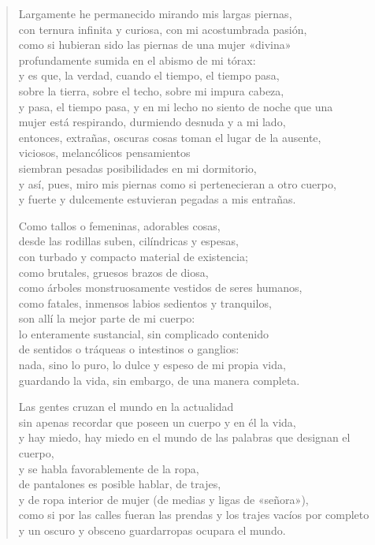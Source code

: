\documentclass[12pt]{article}
\begin{document}
\clearpage
{}
\begin{verse}

Largamente he permanecido mirando mis largas piernas,\\
con ternura infinita y curiosa, con mi acostumbrada pasión,\\
como si hubieran sido las piernas de una mujer «divina»\\
profundamente sumida en el abismo de mi tórax:\\
y es que, la verdad, cuando el tiempo, el tiempo pasa,\\
sobre la tierra, sobre el techo, sobre mi impura cabeza,\\
y pasa, el tiempo pasa, y en mi lecho no siento de noche que una\\
mujer está respirando, durmiendo desnuda y a mi lado,\\
entonces, extrañas, oscuras cosas toman el lugar de la ausente,\\
viciosos, melancólicos pensamientos\\
siembran pesadas posibilidades en mi dormitorio,\\
y así, pues, miro mis piernas como si pertenecieran a otro cuerpo,\\
y fuerte y dulcemente estuvieran pegadas a mis entrañas.  

Como tallos o femeninas, adorables cosas,\\
desde las rodillas suben, cilíndricas y espesas,\\
con turbado y compacto material de existencia;\\
como brutales, gruesos brazos de diosa,\\
como árboles monstruosamente vestidos de seres humanos,\\
como fatales, inmensos labios sedientos y tranquilos,\\
son allí la mejor parte de mi cuerpo:\\
lo enteramente sustancial, sin complicado contenido\\
de sentidos o tráqueas o intestinos o ganglios:\\
nada, sino lo puro, lo dulce y espeso de mi propia vida,\\
guardando la vida, sin embargo, de una manera completa.  

Las gentes cruzan el mundo en la actualidad\\
sin apenas recordar que poseen un cuerpo y en él la vida,\\
y hay miedo, hay miedo en el mundo de las palabras que designan el cuerpo,\\
y se habla favorablemente de la ropa,\\
de pantalones es posible hablar, de trajes,\\
y de ropa interior de mujer (de medias y ligas de «señora»),\\
como si por las calles fueran las prendas y los trajes vacíos por completo\\
y un oscuro y obsceno guardarropas ocupara el mundo.  


\end{verse}
\end{document}

